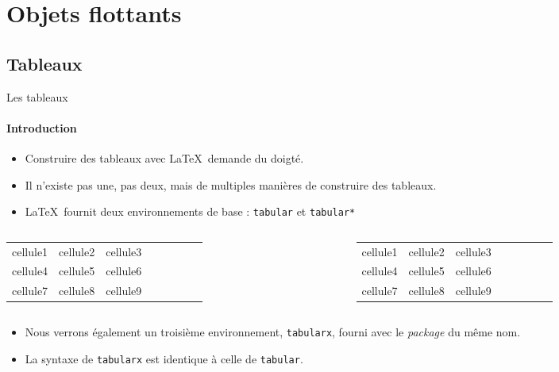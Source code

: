 \section{Objets flottants}

\subsection{Tableaux}

\begin{frame}[fragile,c]{Les tableaux}
	\framesubtitle{Introduction}
	
	\begin{itemize}
		\item Construire des tableaux avec \LaTeX\ demande du doigté.
		\item Il n'existe pas une, pas deux, mais de multiples manières de construire des tableaux.
		\item \LaTeX\ fournit deux environnements de base : \texttt{tabular} et \texttt{tabular*}
	\end{itemize}

	\begin{columns}
		\begin{column}{.49\textwidth}
\begin{codesource}
	\begin{tabular}{colonnes}
		cellule1 & cellule2 & cellule3 \\
		cellule4 & cellule5 & cellule6 \\
		cellule7 & cellule8 & cellule9
	\end{tabular}
\end{codesource}
		\end{column}
		\begin{column}{.49\textwidth}
\begin{codesource}
	\begin{tabular*}{largeur}{colonnes}
		cellule1 & cellule2 & cellule3 \\
		cellule4 & cellule5 & cellule6 \\
		cellule7 & cellule8 & cellule9
	\end{tabular*}
\end{codesource}
		\end{column}
	\end{columns}

	\begin{itemize}
		\item Nous verrons également un troisième environnement, \texttt{tabularx}, fourni avec
		le \emph{package} du même nom.
		\item La syntaxe de \texttt{tabularx} est identique à celle de \texttt{tabular}.
	\end{itemize}
\end{frame}

